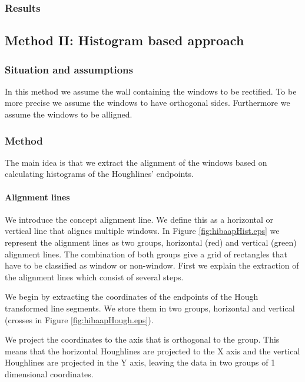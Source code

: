 \subsubsection{Results}



\subsection{Method II: Histogram based approach} 
\subsubsection{Situation and assumptions}
In this method we assume the wall containing the windows to be rectified.
To be more precise we assume the windows to have orthogonal sides.
Furthermore we assume the windows to be alligned.

\subsubsection{Method}
The main idea is that we extract the alignment of the windows based on
calculating histograms of the Houghlines' endpoints.

\paragraph{Alignment lines}
We introduce the concept alignment line. We define this as a horizontal or
vertical line that alignes multiple windows. In Figure
\ref{fig:hibaapHist.eps}
we represent the alignment lines as two groups, horizontal (red) and
vertical (green) alignment lines.  The combination of both groups give a grid of
rectangles that have to be classified as window or non-window.
First we explain the extraction of the alignment lines which consist of several
steps.

We begin by extracting the coordinates of the endpoints of the Hough transformed line
segments. We store them in two groups, horizontal and vertical (crosses in Figure
\ref{fig:hibaapHough.eps}). 


We project the coordinates to the axis that is orthogonal to the group. This means
that the horizontal Houghlines are projected to the X axis and the vertical
Houghlines are projected in the Y axis, leaving the data in two groups of 1
dimensional coordinates.

